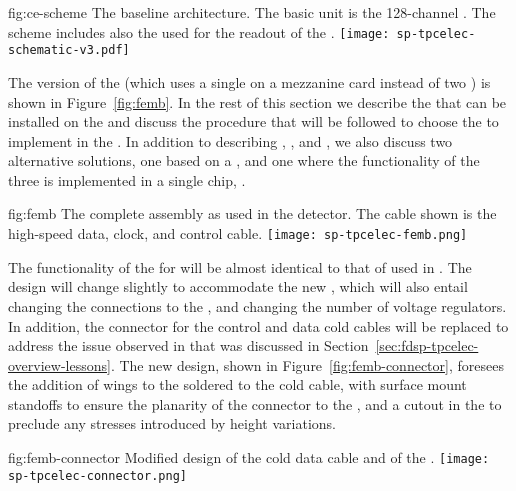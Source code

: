\begin{dunefigure}
{fig:ce-scheme}
{The baseline  architecture. The basic unit is the 
128-channel . The scheme includes also the 
 used for the readout of the .}
\texttt{[image: sp-tpcelec-schematic-v3.pdf]}
\end{dunefigure}

The  version of the  (which uses a single 
 on a mezzanine card instead of two  
) is shown in Figure~\ref{fig:femb}. In the rest of
this section we describe the  that can be installed
on the  and discuss the procedure that will be 
followed to choose the  %
to implement in the %
. %
In addition to
describing , , and ,
we also discuss two alternative solutions, one based on a 
 , and one where the functionality of the
three  is implemented in a single chip, .

\begin{dunefigure}
{fig:femb}
{The complete  assembly as used in the  
detector. The cable shown is the high-speed data, clock, and control cable.}
\texttt{[image: sp-tpcelec-femb.png]}
\end{dunefigure}

The functionality of the  for  will be
almost identical to that of  used in .
The design will change slightly to accommodate the new ,
which will also entail changing the connections to the ,
and changing the number of voltage regulators. In addition, the
connector for the control and data cold cables will be replaced
to address the issue observed in  that was discussed
in Section~\ref{sec:fdsp-tpcelec-overview-lessons}. The new design,
shown in Figure~\ref{fig:femb-connector}, foresees the addition
of wings to the  soldered to the cold cable, with 
surface mount standoffs to ensure the planarity of the connector
to the , and a cutout in the  to preclude %
any stresses introduced by height variations.

\begin{dunefigure}
{fig:femb-connector}
{Modified design of the cold data cable and of the  .}
\texttt{[image: sp-tpcelec-connector.png]}
\end{dunefigure}

